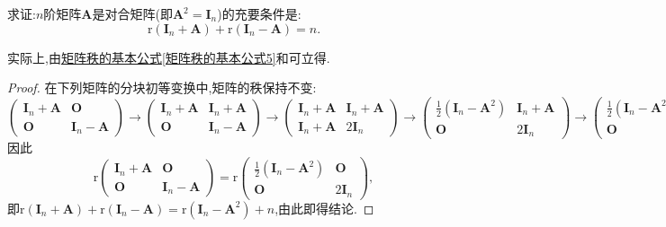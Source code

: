 \documentclass[../../main.tex]{subfiles}
\begin{document}
\begin{proposition}[对合矩阵关于秩的判定准则]\label{proposition:对合矩阵关于秩的判定准则}
求证:\(n\)阶矩阵\(\boldsymbol{A}\)是对合矩阵(即\(\boldsymbol{A}^2 = \boldsymbol{I}_n\))的充要条件是:
\[
\mathrm{r}(\boldsymbol{I}_n+\boldsymbol{A})+\mathrm{r}(\boldsymbol{I}_n - \boldsymbol{A}) = n.
\]
\end{proposition}
\begin{note}
实际上,由\hyperref[矩阵秩的基本公式5]{矩阵秩的基本公式\ref{矩阵秩的基本公式5}}和可立得.
\end{note}
\begin{proof}
在下列矩阵的分块初等变换中,矩阵的秩保持不变:
\[
\begin{pmatrix}
\boldsymbol{I}_n+\boldsymbol{A}&\boldsymbol{O}\\
\boldsymbol{O}&\boldsymbol{I}_n - \boldsymbol{A}
\end{pmatrix}\to
\begin{pmatrix}
\boldsymbol{I}_n+\boldsymbol{A}&\boldsymbol{I}_n+\boldsymbol{A}\\
\boldsymbol{O}&\boldsymbol{I}_n - \boldsymbol{A}
\end{pmatrix}\to
\begin{pmatrix}
\boldsymbol{I}_n+\boldsymbol{A}&\boldsymbol{I}_n+\boldsymbol{A}\\
\boldsymbol{I}_n+\boldsymbol{A}&2\boldsymbol{I}_n
\end{pmatrix}\to
\begin{pmatrix}
\frac{1}{2}(\boldsymbol{I}_n - \boldsymbol{A}^2)&\boldsymbol{I}_n+\boldsymbol{A}\\
\boldsymbol{O}&2\boldsymbol{I}_n
\end{pmatrix}\to
\begin{pmatrix}
\frac{1}{2}(\boldsymbol{I}_n - \boldsymbol{A}^2)&\boldsymbol{O}\\
\boldsymbol{O}&2\boldsymbol{I}_n
\end{pmatrix}.
\]
因此
\[
\mathrm{r}\begin{pmatrix}
\boldsymbol{I}_n+\boldsymbol{A}&\boldsymbol{O}\\
\boldsymbol{O}&\boldsymbol{I}_n - \boldsymbol{A}
\end{pmatrix}=\mathrm{r}\begin{pmatrix}
\frac{1}{2}(\boldsymbol{I}_n - \boldsymbol{A}^2)&\boldsymbol{O}\\
\boldsymbol{O}&2\boldsymbol{I}_n
\end{pmatrix},
\]
即\(\mathrm{r}(\boldsymbol{I}_n+\boldsymbol{A})+\mathrm{r}(\boldsymbol{I}_n - \boldsymbol{A})=\mathrm{r}(\boldsymbol{I}_n - \boldsymbol{A}^2)+n\),由此即得结论. 
\end{proof}
\end{document}
